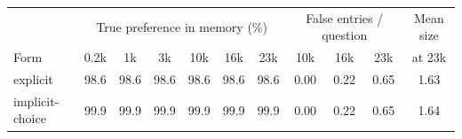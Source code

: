 \begin{tabular}{l|cccccc|ccc|c}
\toprule
 & \multicolumn{6}{c|}{True preference in memory (\%)} & \multicolumn{3}{c|}{False entries / question} & Mean size \\
Form & 0.2k & 1k & 3k & 10k & 16k & 23k & 10k & 16k & 23k & at 23k \\
\midrule
explicit & 98.6 & 98.6 & 98.6 & 98.6 & 98.6 & 98.6 & 0.00 & 0.22 & 0.65 & 1.63 \\
implicit-choice & 99.9 & 99.9 & 99.9 & 99.9 & 99.9 & 99.9 & 0.00 & 0.22 & 0.65 & 1.64 \\
\bottomrule
\end{tabular}
